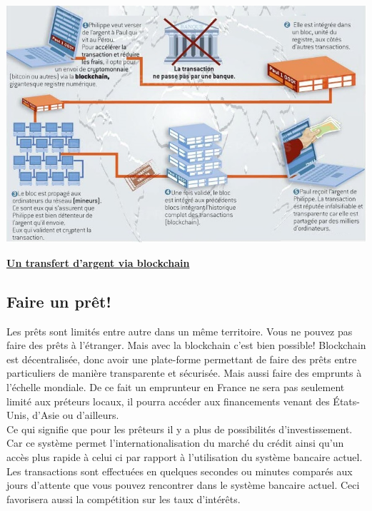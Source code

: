 \documentclass[12pt]{report}
\begin{document}
\includegraphics[width=1\textwidth]{transfert_argent}
\begin{center}
   \textbf{\underline{Un transfert d'argent via blockchain}} \\[1cm]
\end{center}


    \subsection{Faire un prêt! }
    
\hspace{1cm} Les prêts sont limités entre autre dans un même territoire. Vous ne pouvez pas faire des prêts à l'étranger. Mais avec la blockchain c'est bien possible! Blockchain  est décentralisée, donc avoir une plate-forme permettant de faire des prêts entre particuliers de manière transparente et sécurisée. Mais aussi faire des emprunts à l'échelle mondiale. De ce fait un emprunteur en France ne sera pas seulement limité aux préteurs locaux, il pourra accéder aux financements venant des États-Unis, d'Asie ou d'ailleurs. \\

\hspace{1cm} Ce qui signifie que pour les prêteurs il y a plus de possibilités d’investissement. Car ce système permet l’internationalisation du marché du crédit ainsi qu’un accès plus rapide à celui ci par rapport à l’utilisation du système bancaire actuel. Les transactions sont effectuées en quelques secondes ou minutes comparés aux jours d’attente que vous pouvez rencontrer dans le système bancaire actuel. Ceci favorisera aussi la compétition sur les taux d'intérêts.
\end{document}
